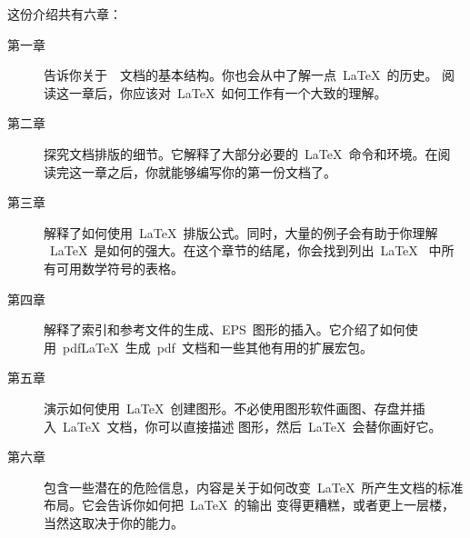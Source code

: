 \bigskip
\noindent 这份介绍共有六章：%
\begin{description}%
\item[第一章] 告诉你关于~\LaTeXe{}~文档的基本结构。你也会从中了解一点~\LaTeX{}~的历史。
              阅读这一章后，你应该对~\LaTeX{}~如何工作有一个大致的理解。
\item[第二章] 探究文档排版的细节。它解释了大部分必要的~\LaTeX{}~命令和环境。在阅
              读完这一章之后，你就能够编写你的第一份文档了。%
\item[第三章] 解释了如何使用~\LaTeX{}~排版公式。同时，大量的例子会有助于你理解
              ~\LaTeX{}~是如何的强大。在这个章节的结尾，你会找到列出~\LaTeX{}~
              中所有可用数学符号的表格。%
\item[第四章] 解释了索引和参考文件的生成、EPS~图形的插入。它介绍了如何使用~pdf\LaTeX{}~生成~pdf~文档和一些其他有用的扩展宏包。%
\item[第五章] 演示如何使用~\LaTeX{}~创建图形。不必使用图形软件画图、存盘并插入~\LaTeX{}~文档，你可以直接描述
              图形，然后~\LaTeX{}~会替你画好它。
\item[第六章]
包含一些潜在的危险信息，内容是关于如何改变~\LaTeX{}~所产生文档的标准布局。它会告诉你如何把~\LaTeX{}~的输出
变得更糟糕，或者更上一层楼，当然这取决于你的能力。
\end{description}%

